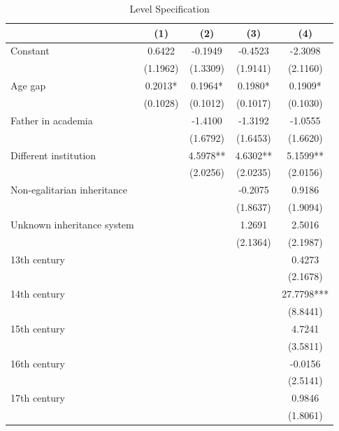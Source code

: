 \begin{table}[H]
\centering
\caption{Level Specification}
\label{tab:levels_regressions}

\begin{tablebody}
\begin{tabular}{lcccc}
\toprule
& (1) & (2) & (3) & (4) \\
\midrule

Constant
& 0.6422
& -0.1949
& -0.4523
& -2.3098 \\
& (1.1962)
& (1.3309)
& (1.9141)
& (2.1160) \\

Age gap 
& 0.2013* 
& 0.1964* 
& 0.1980* 
& 0.1909* \\
& (0.1028) 
& (0.1012) 
& (0.1017) 
& (0.1030) \\

Father in academia 
&  
& -1.4100 
& -1.3192 
& -1.0555 \\
&  
& (1.6792) 
& (1.6453) 
& (1.6620) \\

Different institution 
&  
& 4.5978** 
& 4.6302** 
& 5.1599** \\
&  
& (2.0256) 
& (2.0235) 
& (2.0156) \\

Non-egalitarian inheritance 
&  
&  
& -0.2075 
& 0.9186 \\
&  
&  
& (1.8637) 
& (1.9094) \\

Unknown inheritance system 
&  
&  
& 1.2691 
& 2.5016 \\
&  
&  
& (2.1364) 
& (2.1987) \\

13th century
& & & & 0.4273 \\
& & & & (2.1678) \\

14th century
& & & & 27.7798*** \\
& & & & (8.8441) \\

15th century
& & & & 4.7241 \\
& & & & (3.5811) \\

16th century
& & & & -0.0156 \\
& & & & (2.5141) \\

17th century
& & & & 0.9846 \\
& & & & (1.8061) \\


\end{tabular}
\end{tablebody}
\end{table}
